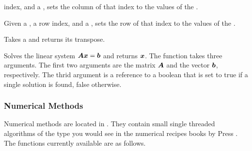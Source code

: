 \begin{description}
  index, and a , sets the column of that index to the values of
  the .
\item[\daxmath{MatrixSetRow}] Given a , a row index,
  and a , sets the row of that index to the values of the
  .
\item[\daxmath{MatrixTranspose}]  Takes a
   and returns its transpose.
\item[\daxmath{SolveLinearSystem}]  Solves the linear
  system $\matrixsym{A}\vectorsym{x} = \vectorsym{b}$ and returns
  $\vectorsym{x}$. The function takes three arguments. The first two
  arguments are the matrix $\matrixsym{A}$ and the vector $\vectorsym{b}$,
  respectively. The thrid argument is a reference to a boolean that is set
  to true if a single solution is found, false otherwise.
\end{description}

\subsubsection{Numerical Methods}

Numerical methods are located in . They
contain small single threaded algorithms of the type you would see in the
numerical recipes books by Press \etal{}. The functions
currently available are as follows.


